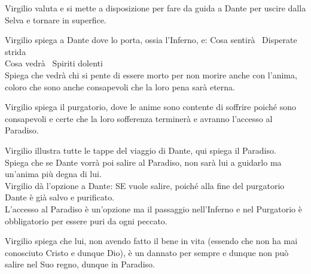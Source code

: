 \documentclass{article}
\begin{document}
Virgilio valuta e si mette a disposizione per fare da guida a Dante per uscire dalla Selva e tornare in superfice.


Virgilio spiega a Dante dove lo porta, ossia l'Inferno, e:
Cosa sentirà \textrightarrow\  Disperate strida\\
Cosa vedrà \textrightarrow\  Spiriti dolenti\\
Spiega che vedrà chi si pente di essere morto per non morire anche con l'anima, coloro che sono anche consapevoli che la loro pena sarà eterna.


Virgilio spiega il purgatorio, dove le anime sono contente di soffrire poiché sono consapevoli e certe che la loro sofferenza terminerà e avranno l'accesso al Paradiso.


Virgilio illustra tutte le tappe del viaggio di Dante, qui spiega il Paradiso.\\
Spiega che se Dante vorrà poi salire al Paradiso, non sarà lui a guidarlo ma un'anima più degna di lui.\\
Virgilio dà l'opzione a Dante: SE vuole salire, poiché alla fine del purgatorio Dante è già salvo e purificato.\\
L'accesso al Paradiso è un'opzione ma il passaggio nell'Inferno e nel Purgatorio è obbligatorio per essere puri da ogni peccato.


Virgilio spiega che lui, non avendo fatto il bene in vita (essendo che non ha mai conosciuto Cristo e dunque Dio), è un dannato per sempre e dunque non può salire nel Suo regno, dunque in Paradiso.
\end{document}
